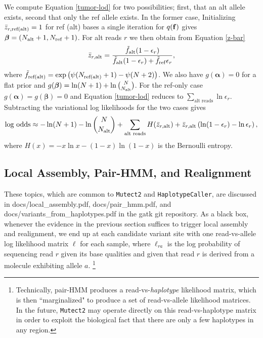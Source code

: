\documentclass[nofootinbib,amssymb,amsmath]{revtex4}
\newcommand{\vf}{{\bf f}}
\newcommand{\valpha}{{\bm{\alpha}}}
\newcommand{\vbeta}{{\bm{\beta}}}
\newcommand{\code}[1]{\texttt{#1}}
\begin{document}
We compute Equation \ref{tumor-lod} for two possibilities; first, that an alt allele exists, second that only the ref allele exists.  In the former case, Initializing $\bar{z}_{r,{\rm ref(alt)}} = 1$ for ref (alt) bases a single iteration for $q(\vf)$ gives $\vbeta = (N_{\rm alt} + 1, N_{\rm ref} + 1)$.  For alt reads $r$ we then obtain from Equation \ref{z-bar}
\begin{equation}
\bar{z}_{r,{\rm alt}} = \frac{\tilde{f}_{\rm alt} (1 - \epsilon_r)}{\tilde{f}_{\rm alt} (1 - \epsilon_r) + \tilde{f}_{\rm ref} \epsilon_r},
\end{equation}
where $\tilde{f}_{\rm ref(alt)} = \exp \left( \psi(N_{\rm ref(alt)} + 1) - \psi(N + 2) \right)$.  We also have $g(\valpha) = 0$ for a flat prior and $g(\vbeta) = \ln (N+1) + \ln \binom{N}{N_{\rm alt}}$.  For the ref-only case $g(\valpha) = g(\vbeta) = 0$ and Equation \ref{tumor-lod} reduces to $\sum_{\text{alt reads}} \ln \epsilon_r$.  Subtracting the variational log likelihoods for the two cases gives
\begin{equation}
\text{log odds} \approx -\ln (N+1) - \ln \binom{N}{N_{\rm alt}} + \sum_{\text{alt reads}} H(\bar{z}_{r,{\rm alt}}) + \bar{z}_{r,{\rm alt}} \left( \ln (1 - \epsilon_r) - \ln \epsilon_r \right),
\end{equation}
where $H(x) = - x \ln x - (1-x) \ln (1-x)$ is the Bernoulli entropy.

\subsection{Local Assembly, Pair-HMM, and Realignment}
These topics, which are common to \code{Mutect2} and \code{HaplotypeCaller}, are discussed in docs/local{\_}assembly.pdf, docs/pair{\_}hmm.pdf, and docs/variants{\_}from{\_}haplotypes.pdf in the gatk git repository.  As a black box, whenever the evidence in the previous section suffices to trigger local assembly and realignment, we end up at each candidate variant site with one read-vs-allele log likelihood matrix $\ell$ for each sample, where $ \ell_{ra}$ is the log probability of sequencing read $r$ given its base qualities and given that read $r$ is derived from a molecule exhibiting allele $a$.  \footnote{Technically, pair-HMM produces a read-vs-\textit{haplotype} likelihood matrix, which is then ``marginalized" to produce a set of read-vs-allele likelihood matrices.  In the future, \code{Mutect2} may operate directly on this read-vs-haplotype matrix in order to exploit the biological fact that there are only a few haplotypes in any region.}
\end{document}
